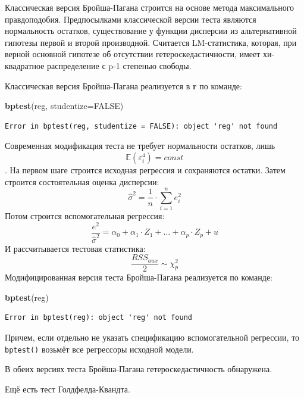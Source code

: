 \documentclass[]{book}
\newenvironment{Shaded}{\begin{snugshade}}{\end{snugshade}}
\newcommand{\DataTypeTok}[1]{\textcolor[rgb]{0.13,0.29,0.53}{#1}}
\newcommand{\KeywordTok}[1]{\textcolor[rgb]{0.13,0.29,0.53}{\textbf{#1}}}
\newcommand{\NormalTok}[1]{#1}
\newcommand{\OtherTok}[1]{\textcolor[rgb]{0.56,0.35,0.01}{#1}}
\begin{document}
Классическая версия Бройша-Пагана строится на основе метода максимального правдоподобия. Предпосылками классической версии теста являются нормальность остатков, существование у функции дисперсии из альтернативной гипотезы первой и второй производной. Считается LM-статистика, которая, при верной основной гипотезе об отсутствии гетероскедастичности, имеет хи-квадратное распределение с p-1 степенью свободы.

Классическая версия Бройша-Пагана реализуется в \textbf{r} по команде:

\begin{Shaded}
\begin{Highlighting}[]
\KeywordTok{bptest}\NormalTok{(reg, }\DataTypeTok{studentize=}\OtherTok{FALSE}\NormalTok{)}
\end{Highlighting}
\end{Shaded}

\begin{verbatim}
Error in bptest(reg, studentize = FALSE): object 'reg' not found
\end{verbatim}

Современная модификация теста не требует нормальности остатков, лишь \[{\mathbb E}({\varepsilon^4_i}) = const\].
На первом шаге строится исходная регрессия и сохраняются остатки. Затем строится состоятельная оценка дисперсии:
\[
\hat{\sigma}^2 = \frac{1}{n} \cdot \sum_{i=1}^{n} {e^2_i}
\]
Потом строится вспомогательная регрессия:
\[
\frac{e^2}{\hat{\sigma}^2} = \alpha_0 + \alpha_1 \cdot Z_1 + \ldots + \alpha_p \cdot Z_p + u
\]
И рассчитывается тестовая статистика:
\[
\frac{RSS_{aux}}{2} \sim \chi^2_{p}
\]
Модифицированная версия теста Бройша-Пагана реализуется по команде:

\begin{Shaded}
\begin{Highlighting}[]
\KeywordTok{bptest}\NormalTok{(reg)}
\end{Highlighting}
\end{Shaded}

\begin{verbatim}
Error in bptest(reg): object 'reg' not found
\end{verbatim}

Причем, если отдельно не указать спецификацию вспомогательной регрессии, то \texttt{bptest()} возьмёт все регрессоры исходной модели.

В обеих версиях теста Бройша-Пагана гетероскедастичность обнаружена.

Ещё есть тест Голдфелда-Квандта.
\end{document}
